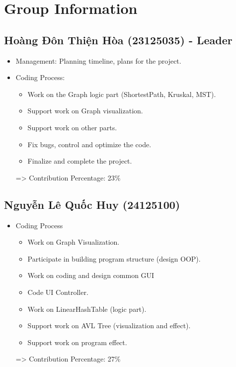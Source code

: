 \section{Group Information}
\subsection{Hoàng Đôn Thiện Hòa (23125035) - Leader}
\begin{itemize}
    \item  Management: Planning timeline, plans for the project.
    \item Coding Process:
    \begin{itemize}
        \item Work on the Graph logic part (ShortestPath, Kruskal, MST).
        \item Support work on Graph visualization.
        \item Support work on other parts.
        \item Fix bugs, control and optimize the code.
        \item Finalize and complete the project.

    \end{itemize}
    => Contribution Percentage: 23\%
\end{itemize}

\subsection{Nguyễn Lê Quốc Huy (24125100)}
\begin{itemize}
    \item Coding Process    
    \begin{itemize}
        \item Work on Graph Visualization.
        \item Participate in building program structure (design OOP).
        \item Work on coding and design common GUI 
        \item Code UI Controller.
        \item Work on LinearHashTable (logic part).
        \item Support work on AVL Tree (visualization and effect).
        \item Support work on program effect.
    \end{itemize}
    => Contribution Percentage: 27\%
\end{itemize}

